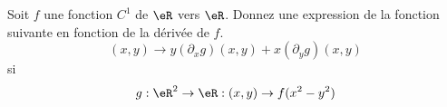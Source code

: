 
\begin{exercice}\label{exo0054}

Soit $f$ une fonction $C^1$ de $\eR$ vers $\eR$. Donnez une
expression de la fonction suivante en fonction de la dérivée de $f$.
\[
(x,y) \rightarrow y (\partial_x g)(x,y) + x (\partial_y g)(x,y)
\]
si
\[
g : \eR^2 \rightarrow \eR : (x,y) \rightarrow f(x^2-y^2)
\]

\end{exercice}
